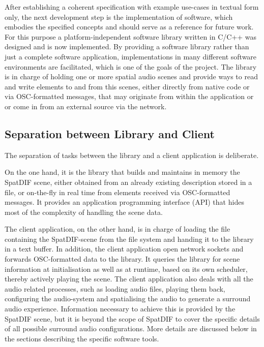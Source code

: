 \documentclass{article}
\begin{document}
After establishing a coherent specification with example use-cases in textual form only, the next development step is the implementation of software, which embodies the specified concepts and should serve as a reference for future work.
For this purpose a platform-independent software library written in C/C++ was designed and is now implemented. \cite{Miyama_2013}
By providing a software library rather than just a complete software application, implementations in many different software environments are facilitated, which is one of the goals of the project.
The library is in charge of holding one or more spatial audio scenes and provide ways to read and write elements to and from this scenes, either directly from native code or via OSC-formatted messages, that may originate from within the application or or come in from an external source via the network.

\subsection{Separation between Library and Client}\label{subsec:separation}

The separation of tasks between the library and a client application is deliberate.

On the one hand, it is the library that builds and maintains in memory the SpatDIF scene, either obtained from an already existing description stored in a file, or on-the-fly in real time from elements received via OSC-formatted messages.
It provides an application programming interface (API) that hides most of the complexity of handling the scene data.

The client application, on the other hand, is in charge of loading the file containing the SpatDIF-scene from the file system and handing it to the library in a text buffer.
In addition, the client application open network sockets and forwards OSC-formatted data to the library.
It queries the library for scene information at initialisation as well as at runtime, based on its own scheduler, thereby actively playing the scene.
The client application also deals with all the audio related processes, such as loading audio files, playing them back, configuring the audio-system and spatialising the audio to generate a surround audio experience.
Information necessary to achieve this is provided by the SpatDIF scene, but it is beyond the scope of SpatDIF to cover the specific details of all possible surround audio configurations.
More details are discussed below in the sections describing the specific software tools.
\end{document}
